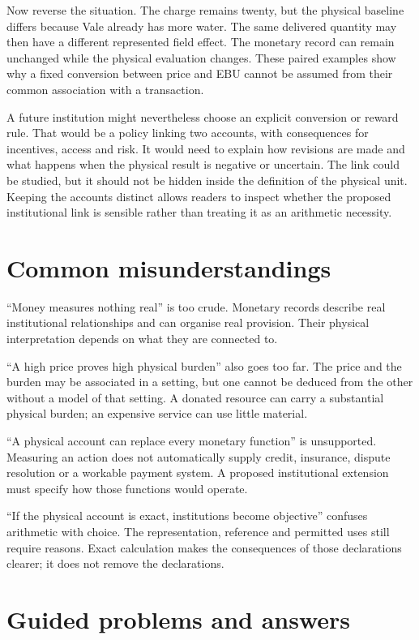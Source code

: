 Now reverse the situation. The charge remains twenty, but the physical baseline differs because Vale already has more water. The same delivered quantity may then have a different represented field effect. The monetary record can remain unchanged while the physical evaluation changes. These paired examples show why a fixed conversion between price and EBU cannot be assumed from their common association with a transaction.

A future institution might nevertheless choose an explicit conversion or reward rule. That would be a policy linking two accounts, with consequences for incentives, access and risk. It would need to explain how revisions are made and what happens when the physical result is negative or uncertain. The link could be studied, but it should not be hidden inside the definition of the physical unit. Keeping the accounts distinct allows readers to inspect whether the proposed institutional link is sensible rather than treating it as an arithmetic necessity.

\section{Common misunderstandings}
``Money measures nothing real'' is too crude. Monetary records describe real institutional relationships and can organise real provision. Their physical interpretation depends on what they are connected to.

``A high price proves high physical burden'' also goes too far. The price and the burden may be associated in a setting, but one cannot be deduced from the other without a model of that setting. A donated resource can carry a substantial physical burden; an expensive service can use little material.

``A physical account can replace every monetary function'' is unsupported. Measuring an action does not automatically supply credit, insurance, dispute resolution or a workable payment system. A proposed institutional extension must specify how those functions would operate.

``If the physical account is exact, institutions become objective'' confuses arithmetic with choice. The representation, reference and permitted uses still require reasons. Exact calculation makes the consequences of those declarations clearer; it does not remove the declarations.

\section{Guided problems and answers}

